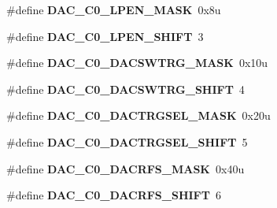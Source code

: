 \begin{DoxyCompactItemize}
\item 
\hypertarget{group___d_a_c___register___masks_ga54a04b9ae84c5a4f8977ae2e1a889717}{}\#define {\bfseries D\+A\+C\+\_\+\+C0\+\_\+\+L\+P\+E\+N\+\_\+\+M\+A\+S\+K}~0x8u\label{group___d_a_c___register___masks_ga54a04b9ae84c5a4f8977ae2e1a889717}

\item 
\hypertarget{group___d_a_c___register___masks_ga97aaa812a3938df3559cb40b893db431}{}\#define {\bfseries D\+A\+C\+\_\+\+C0\+\_\+\+L\+P\+E\+N\+\_\+\+S\+H\+I\+F\+T}~3\label{group___d_a_c___register___masks_ga97aaa812a3938df3559cb40b893db431}

\item 
\hypertarget{group___d_a_c___register___masks_ga7e785d90fec3c1817fc53fea41f41644}{}\#define {\bfseries D\+A\+C\+\_\+\+C0\+\_\+\+D\+A\+C\+S\+W\+T\+R\+G\+\_\+\+M\+A\+S\+K}~0x10u\label{group___d_a_c___register___masks_ga7e785d90fec3c1817fc53fea41f41644}

\item 
\hypertarget{group___d_a_c___register___masks_ga25e2afd71ee5cc41adde6f072c9d2604}{}\#define {\bfseries D\+A\+C\+\_\+\+C0\+\_\+\+D\+A\+C\+S\+W\+T\+R\+G\+\_\+\+S\+H\+I\+F\+T}~4\label{group___d_a_c___register___masks_ga25e2afd71ee5cc41adde6f072c9d2604}

\item 
\hypertarget{group___d_a_c___register___masks_gac6dd81bc6500fc4b972c62bde339f31d}{}\#define {\bfseries D\+A\+C\+\_\+\+C0\+\_\+\+D\+A\+C\+T\+R\+G\+S\+E\+L\+\_\+\+M\+A\+S\+K}~0x20u\label{group___d_a_c___register___masks_gac6dd81bc6500fc4b972c62bde339f31d}

\item 
\hypertarget{group___d_a_c___register___masks_ga32f43711fa193364231213bd67c989f4}{}\#define {\bfseries D\+A\+C\+\_\+\+C0\+\_\+\+D\+A\+C\+T\+R\+G\+S\+E\+L\+\_\+\+S\+H\+I\+F\+T}~5\label{group___d_a_c___register___masks_ga32f43711fa193364231213bd67c989f4}

\item 
\hypertarget{group___d_a_c___register___masks_gadc1973eafb50599b83de95422477a1f5}{}\#define {\bfseries D\+A\+C\+\_\+\+C0\+\_\+\+D\+A\+C\+R\+F\+S\+\_\+\+M\+A\+S\+K}~0x40u\label{group___d_a_c___register___masks_gadc1973eafb50599b83de95422477a1f5}

\item 
\hypertarget{group___d_a_c___register___masks_ga495d0702c9899844340d198120a77e33}{}\#define {\bfseries D\+A\+C\+\_\+\+C0\+\_\+\+D\+A\+C\+R\+F\+S\+\_\+\+S\+H\+I\+F\+T}~6\label{group___d_a_c___register___masks_ga495d0702c9899844340d198120a77e33}


\end{DoxyCompactItemize}
